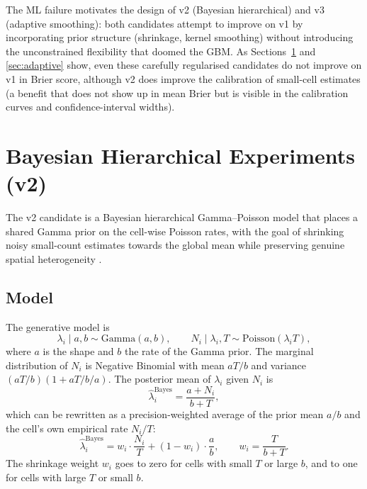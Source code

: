 \documentclass[10pt,a4paper,twocolumn]{article}
\begin{document}
The ML failure motivates the design of v2 (Bayesian hierarchical) and v3 (adaptive smoothing): both candidates attempt to improve on v1 by incorporating prior structure (shrinkage, kernel smoothing) without introducing the unconstrained flexibility that doomed the GBM. As Sections~\ref{sec:bayesian} and \ref{sec:adaptive} show, even these carefully regularised candidates do not improve on v1 in Brier score, although v2 does improve the calibration of small-cell estimates (a benefit that does not show up in mean Brier but is visible in the calibration curves and confidence-interval widths).

\section{Bayesian Hierarchical Experiments (v2)}\label{sec:bayesian}

The v2 candidate is a Bayesian hierarchical Gamma--Poisson model that places a shared Gamma prior on the cell-wise Poisson rates, with the goal of shrinking noisy small-count estimates towards the global mean while preserving genuine spatial heterogeneity \cite{clayton1987}.

\subsection{Model}

The generative model is
\begin{equation}\label{eq:bayes-gen}
\lambda_i \mid a, b \sim \text{Gamma}(a, b), \qquad N_i \mid \lambda_i, T \sim \text{Poisson}(\lambda_i T),
\end{equation}
where $a$ is the shape and $b$ the rate of the Gamma prior. The marginal distribution of $N_i$ is Negative Binomial with mean $aT/b$ and variance $(aT/b)(1 + aT/b/a)$. The posterior mean of $\lambda_i$ given $N_i$ is
\begin{equation}\label{eq:bayes-post-mean}
\hat\lambda_i^{\text{Bayes}} = \frac{a + N_i}{b + T},
\end{equation}
which can be rewritten as a precision-weighted average of the prior mean $a/b$ and the cell's own empirical rate $N_i/T$:
\begin{equation}\label{eq:shrinkage}
\hat\lambda_i^{\text{Bayes}} = w_i \cdot \frac{N_i}{T} + (1-w_i) \cdot \frac{a}{b}, \qquad w_i = \frac{T}{b + T}.
\end{equation}
The shrinkage weight $w_i$ goes to zero for cells with small $T$ or large $b$, and to one for cells with large $T$ or small $b$.
\end{document}
